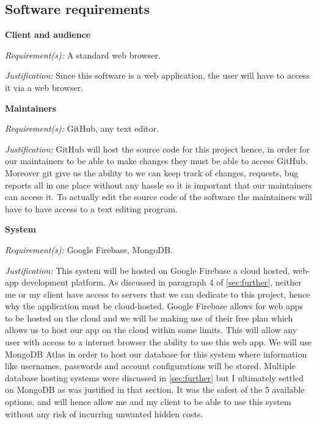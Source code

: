 \subsection{Software requirements}

\textsf{\bfseries Client and audience} \\ \vspace{0.1cm}

\textit{Requirement(s):} A standard web browser. \\ \vspace{0.1cm}

\textit{Justification:}
Since this software is a web application, the user will 
have to access it via a web browser. 
\\ \vspace{0.2cm}

\textsf{\bfseries Maintainers} \\ \vspace{0.1cm}

\textit{Requirement(s):} GitHub, any text editor. \\ \vspace{0.1cm}

\textit{Justification:}
GitHub will host the source code for this project hence,
in order for our maintainers to be able to make changes 
they must be able to access GitHub. Moreover git give us 
the ability to we can keep track of changes, requests,
bug reports all in one place without any hassle so it is 
important that our maintainers can access it. To actually 
edit the source code of the software the maintainers will 
have to have access to a text editing program. 
\\ \vspace{0.2cm}

\textsf{\bfseries System} \\ \vspace{0.1cm}

\textit{Requirement(s):} Google Firebase, MongoDB. \\ \vspace{0.1cm}

\textit{Justification:}
This system will be hosted on Google Firebase a cloud hosted, 
web-app development platform. As discussed in paragraph 4 of
\ref{sec:further}, neither me or my client have access to 
servers that we can dedicate to this project, hence why the 
application must be cloud-hosted. Google Firebase allows for
web apps to be hosted on the cloud and we will be making use
of their free plan which allows us to host our app on the 
cloud within some limits. This will allow any user with 
access to a internet browser the ability to use this web 
app. We will use MongoDB
Atlas in order to host our database for this system where 
information like usernames, passwords and account
configurations will be stored. Multiple database hosting 
systems were discussed in \ref{sec:further} but I ultimately 
settled on MongoDB as was justified in that section. It was
the safest of the 5 available options, and will hence allow
me and my client to be able to use this system without any
risk of incurring unwanted hidden costs.

